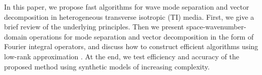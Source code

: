  In this paper, we  propose fast algorithms for  wave mode separation and vector decomposition in  heterogeneous transverse isotropic (TI) media.
 First, we give a brief review of the underlying principles. Then we present space-wavenumber-domain operations for mode separation
 and vector decomposition in the form of Fourier integral operators, and discuss how to construct efficient algorithms using low-rank approximation
\cite[]{engquist.ying:2008}. 
 At the end, we test efficiency and accuracy of the proposed method using synthetic models of increasing complexity.

